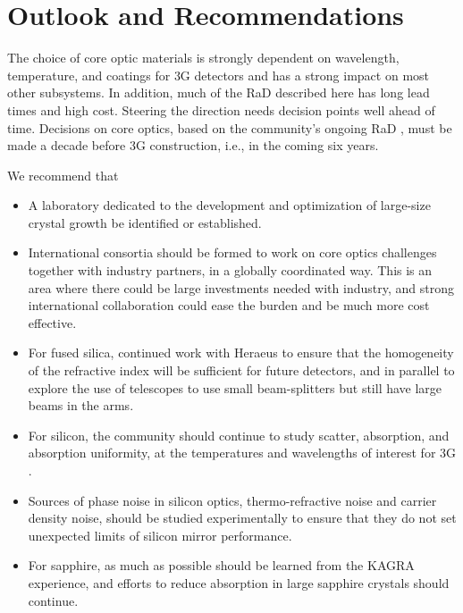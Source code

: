 \section{Outlook and Recommendations} 
The choice of core optic materials is strongly dependent on wavelength, temperature, and coatings for \ac{3G}  detectors and has a strong impact on most other subsystems. In addition, much of the \ac{RaD}   described here has long lead times and high cost. Steering the direction needs decision points well ahead of time. Decisions on core optics, based on the community's ongoing \ac{RaD}  , must be made a decade before \ac{3G}  construction, i.e., in the coming six years. 

We recommend that
\begin{itemize}
\item A laboratory dedicated to the development and optimization of large-size crystal growth be identified or established.
\item International consortia should be formed to work on core optics challenges together with industry
partners, in a globally coordinated way.  This is an area where there could be large investments needed with industry, and strong international collaboration could ease the burden and be much more cost effective.
\item For fused silica, continued work with \acf*{Heraeus} to ensure that the homogeneity of the refractive index will be sufficient for future detectors, and in parallel to explore the use of telescopes to use small beam-splitters but still have large beams in the arms. 
\item For silicon, the community should continue to study scatter, absorption, and absorption uniformity, at the temperatures and wavelengths of interest for \ac{3G} . 
\item Sources of phase noise in silicon optics, thermo-refractive noise and carrier density noise, should be studied experimentally  to ensure that they do not set unexpected limits of silicon mirror performance. 
\item For sapphire, as much as possible should be learned from the \ac{KAGRA} experience, and efforts to reduce absorption in large sapphire crystals should continue. 
\end{itemize}

